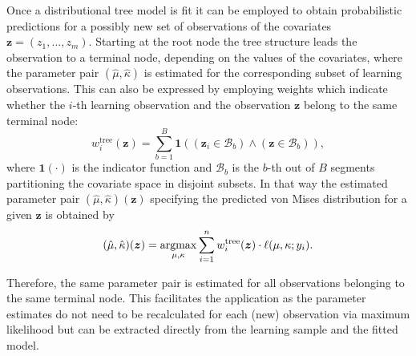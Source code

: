\documentclass[nojss]{jss}
\newcommand{\argmax}{\operatorname{argmax}\displaylimits}
\numberwithin{equation}{section}
\begin{document}

Once a distributional tree model is fit it can be employed to obtain probabilistic predictions
for a possibly new set of observations of the covariates $\bm{z} = (z_1, \ldots, z_m)$.
Starting at the root node the tree structure leads the observation to a terminal node, depending on the values of the covariates, where the parameter pair $(\hat{\mu}, \hat{\kappa})$ is estimated for
the corresponding subset of learning observations. 
This can also be expressed by employing weights which indicate whether the $i$-th learning observation and the observation $\bm{z}$ belong to the same terminal
node:
\begin{equation}
w^{\text{tree}}_i(\bm{z}) = \sum_{b=1}^B \mathbf{1}((\bm{z}_i \in \mathcal{B}_b) \land (\bm{z} \in \mathcal{B}_b)),
\end{equation}
where $\mathbf{1}(\cdot)$ is the indicator function and $\mathcal{B}_b$ is the $b$-th out of $B$ segments
partitioning the covariate space in disjoint subsets. 
In that way the estimated parameter pair $(\hat{\mu},\hat{\kappa})(\bm{z})$ specifying the predicted
von Mises distribution for a given $\bm{z}$ is obtained by
\begin{equation}
(\hat{\mu},\hat{\kappa})(\bm{z}) = \argmax_{\mu,\kappa} \sum_{i=1}^n w^{\text{tree}}_i(\bm{z}) \cdot \ell(\mu,\kappa; y_i).
\end{equation}

Therefore, the same parameter pair is estimated for all observations
belonging to the same terminal node. This facilitates the application as the parameter estimates do 
not need to be recalculated for each (new) observation via maximum likelihood but can be extracted 
directly from the learning sample and the fitted model.
\end{document}
